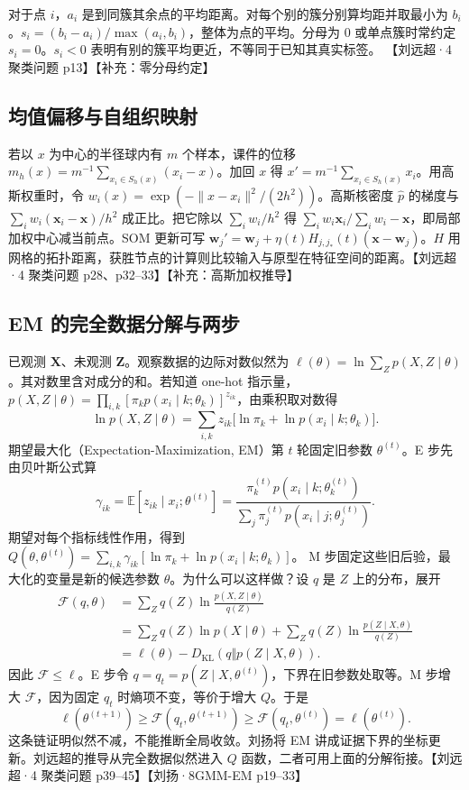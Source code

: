 \documentclass[UTF8,a4paper,zihao=-4,fontset=fandol]{ctexrep}
\begin{document}
对于点 $i$，$a_i$ 是到同簇其余点的平均距离。对每个别的簇分别算均距并取最小为 $b_i$。$s_i=(b_i-a_i)/\max(a_i,b_i)$，整体为点的平均。分母为 0 或单点簇时常约定 $s_i=0$。$s_i<0$ 表明有别的簇平均更近，不等同于已知其真实标签。 【刘远超·4 聚类问题 p13】【补充：零分母约定】

\subsection{均值偏移与自组织映射}
若以 $x$ 为中心的半径球内有 $m$ 个样本，课件的位移
$m_h(x)=m^{-1}\sum_{x_i\in S_h(x)}(x_i-x)$。加回 $x$ 得 $x'=m^{-1}\sum_{x_i\in S_h(x)}x_i$。用高斯权重时，令 $w_i(x)=\exp(-\|x-x_i\|^2/(2h^2))$。高斯核密度 $\widehat p$ 的梯度与 $\sum_i w_i(\bm x_i-\bm x)/h^2$ 成正比。把它除以 $\sum_iw_i/h^2$ 得 $\sum_iw_i\bm x_i/\sum_iw_i-\bm x$，即局部加权中心减当前点。SOM 更新可写 $\bm w_j'=\bm w_j+\eta(t)H_{j,j_*}(t)(\bm x-\bm w_j)$。$H$ 用网格的拓扑距离，获胜节点的计算则比较输入与原型在特征空间的距离。【刘远超·4 聚类问题 p28、p32–33】【补充：高斯加权推导】

\subsection{EM 的完全数据分解与两步}
已观测 $\bm X$、未观测 $\bm Z$。观察数据的边际对数似然为 $\ell(\theta)=\ln\sum_Z p(X,Z\mid\theta)$。其对数里含对成分的和。若知道 one-hot 指示量，$p(X,Z\mid\theta)=\prod_{i,k}[\pi_k p(x_i\mid k;\theta_k)]^{z_{ik}}$，由乘积取对数得
\[
\ln p(X,Z\mid\theta)=\sum_{i,k} z_{ik}\bigl[\ln\pi_k+\ln p(x_i\mid k;\theta_k)\bigr].
\]
期望最大化（Expectation-Maximization, EM）第 $t$ 轮固定旧参数 $\theta^{(t)}$。E 步先由贝叶斯公式算
\[
\gamma_{ik}=\mathbb E[z_{ik}\mid x_i;\theta^{(t)}]
=\frac{\pi_k^{(t)}p(x_i\mid k;\theta_k^{(t)})}
{\sum_j\pi_j^{(t)}p(x_i\mid j;\theta_j^{(t)})}.
\]
期望对每个指标线性作用，得到
$Q(\theta,\theta^{(t)})=\sum_{i,k}\gamma_{ik}[\ln\pi_k+\ln p(x_i\mid k;\theta_k)]$。
M 步固定这些旧后验，最大化的变量是新的候选参数 $\theta$。为什么可以这样做？设 $q$ 是 $Z$ 上的分布，展开
\[
\begin{aligned}
\mathcal F(q,\theta)
&=\sum_Z q(Z)\ln\frac{p(X,Z\mid\theta)}{q(Z)}\\
&=\sum_Z q(Z)\ln p(X\mid\theta)
 +\sum_Z q(Z)\ln\frac{p(Z\mid X,\theta)}{q(Z)}\\
&=\ell(\theta)-D_{\mathrm{KL}}(q\Vert p(Z\mid X,\theta)).
\end{aligned}
\]
因此 $\mathcal F\le\ell$。E 步令 $q=q_t=p(Z\mid X,\theta^{(t)})$，下界在旧参数处取等。M 步增大 $\mathcal F$，因为固定 $q_t$ 时熵项不变，等价于增大 $Q$。于是
\[
\ell(\theta^{(t+1)})\ge\mathcal F(q_t,\theta^{(t+1)})
\ge\mathcal F(q_t,\theta^{(t)})=\ell(\theta^{(t)}).
\]
这条链证明似然不减，不能推断全局收敛。刘扬将 EM 讲成证据下界的坐标更新。刘远超的推导从完全数据似然进入 $Q$ 函数，二者可用上面的分解衔接。【刘远超·4 聚类问题 p39–45】【刘扬·8GMM-EM p19–33】
\end{document}
